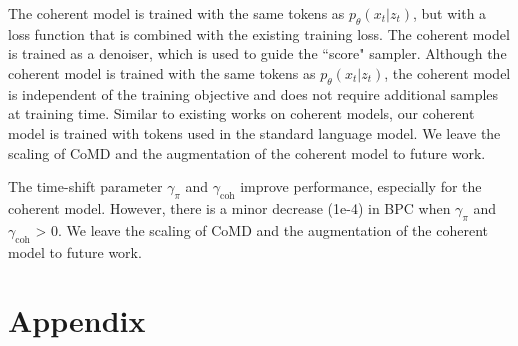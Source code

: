 \documentclass{article} %
\begin{document}
The coherent model is trained with the same tokens as $p_\theta(x_t|z_t)$, but with a loss function that is combined with the existing training loss. The coherent model is trained as a denoiser, which is used to guide the ``score" sampler. Although the coherent model is trained with the same tokens as $p_\theta(x_t|z_t)$, the coherent model is independent of the training objective and does not require additional samples at training time. Similar to existing works on coherent models, our coherent model is trained with tokens used in the standard language model. We leave the scaling of CoMD and the augmentation of the coherent model to future work. 

The time-shift parameter $\gamma_\pi$ and $\gamma_\mathrm{coh}$ improve performance, especially for the coherent model. However, there is a minor decrease (1e-4) in BPC when $\gamma_\pi$ and $\gamma_\mathrm{coh}$ > 0. We leave the scaling of CoMD and the augmentation of the coherent model to future work. 










\appendix
\section{Appendix}
\end{document}

